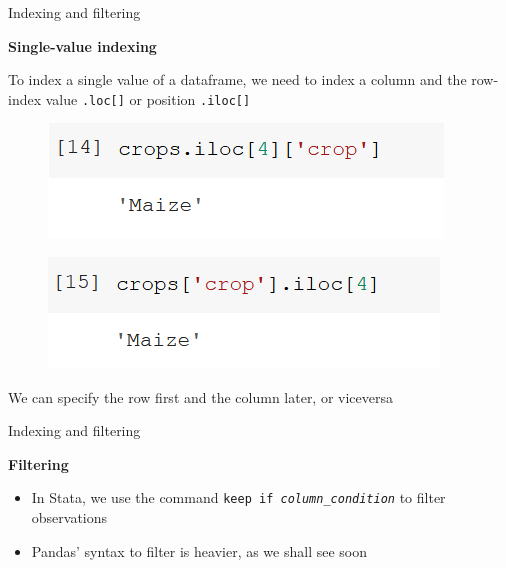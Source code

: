 \documentclass[aspectratio=169]{beamer}
\begin{document}
\begin{frame}{Indexing and filtering}

	\textbf{Single-value indexing}

	To index a single value of a dataframe, we need to index a column and the row-index value \texttt{.loc[]} or position \texttt{.iloc[]}

	\begin{multicols}{2}

		\begin{figure}
			\centering
			\includegraphics[width=\linewidth]{img/single_value_index1.png}
		\end{figure}
		\begin{figure}
			\centering
			\includegraphics[width=\linewidth]{img/single_value_index2.png}
		\end{figure}

	\end{multicols}

	We can specify the row first and the column later, or viceversa

\end{frame}

\begin{frame}{Indexing and filtering}

	\textbf{Filtering}

	\begin{itemize}
		\item In Stata, we use the command \texttt{keep if \textit{column\_condition}} to filter observations
		\item Pandas' syntax to filter is heavier, as we shall see soon
	\end{itemize}

\end{frame}
\end{document}

